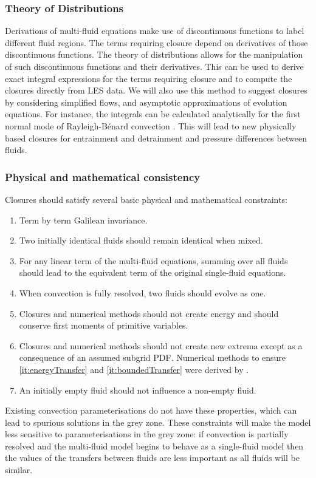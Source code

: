 \documentclass[11pt,a4paper]{article}
\begin{document}
\subsubsection*{Theory of Distributions}

Derivations of multi-fluid equations make use of discontinuous functions to label different fluid regions. The terms requiring closure depend on derivatives of those discontinuous functions. The theory of distributions \cite[]{Schw08} allows for the manipulation of such discontinuous functions and their derivatives. This can be used to derive exact integral expressions for the terms requiring closure and to compute the closures directly from LES data. We will also use this method to suggest closures by considering simplified flows, and asymptotic approximations of evolution equations. For instance, the integrals can be calculated analytically for the first normal mode of Rayleigh-B\'{e}nard convection  \cite[]{SWCM2x}. This will lead to new physically based closures for  entrainment and detrainment  and pressure differences between fluids. 

\subsubsection*{Physical and mathematical consistency}

Closures should satisfy several basic physical and mathematical constraints:
\begin{enumerate}
\item Term by term Galilean invariance.
\item Two initially identical fluids should remain identical when mixed.
\item For any linear term of the multi-fluid equations, summing over all fluids should lead to the equivalent term of the original single-fluid equations.
\item  When convection is fully resolved, two fluids should evolve as one.
\item\label{it:energyTransfer} Closures and numerical methods should not create energy and should conserve first moments of primitive variables.
\item\label{it:boundedTransfer} Closures and numerical methods should not create new extrema except as a consequence of an assumed subgrid PDF. Numerical methods to ensure \ref{it:energyTransfer} and \ref{it:boundedTransfer} were derived by \cite{MWH20}.
\item An initially empty fluid should not influence a non-empty fluid.
\end{enumerate}
Existing convection parameterisations do not have these properties, which can lead to spurious solutions in the grey zone. These constraints will make the model less sensitive to parameterisations in the grey zone: if convection is partially resolved and the multi-fluid model begins to behave as a single-fluid model then the values of the transfers between fluids are less important as all fluids will be similar.
\end{document}
